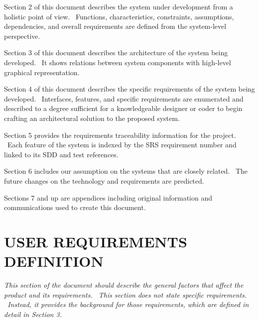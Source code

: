 \documentclass[twoside,letterpaper]{article}
\begin{document}
\begin{flushleft}{\color{black}
Section 2 of this document describes the system under development from a
holistic point of view. \ Functions, characteristics, constraints,
assumptions, dependencies, and overall requirements are defined from
the system-level perspective.}


\bigskip

{\color{black}
Section 3 of this document describes the architecture of the
system being developed. \ It shows relations between system components with high-level graphical representation.}


\bigskip

{\color{black}
Section 4 of this document describes the specific requirements of the
system being developed. \ Interfaces, features, and specific
requirements are enumerated and described to a degree sufficient for a
knowledgeable designer or coder to begin crafting an architectural
solution to the proposed system.}


\bigskip

{\color{black}
Section 5 provides the requirements traceability information for the
project. \ Each feature of the system is indexed by the SRS
requirement number and linked to its SDD and test references.}


\bigskip

{\color{black}
Section 6 includes our assumption on the systems that are closely related. \ The future changes on the technology and requirements are predicted.}


\bigskip

{\color{black}
Sections 7 and up are appendices including original information and
communications used to create this document.}\end{flushleft}

\clearpage\section[USER REQUIREMENTS DEFINITION]{\rmfamily\bfseries\color{black}
USER REQUIREMENTS DEFINITION}
{\color{black}
\foreignlanguage{english}{\textit{This section of the document should
describe the general factors that affect the product and its
requirements. \ This section does not state specific requirements.
\ Instead, it provides the background for those requirements, which are
defined in detail in Section 3.}}\foreignlanguage{english}{ \ }}
\end{document}
